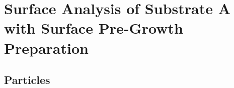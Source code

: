 \clearpage
%
%
\section[Surface Analysis of Substrate A with Surface Pre-Growth Preparation]{Surface Analysis of Substrate A with Surface Pre-Growth Preparation%
    }\label{sec:subAb}


\subsection{Particles}


